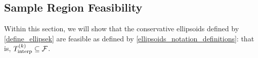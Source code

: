 \subsection{Sample Region Feasibility}
\label{ellipsoid_is_feasible_section}

Within this section, we will show that the conservative ellipsoids defined by \cref{define_ellipsek} are feasible as defined by \cref{ellipsoids_notation_definitions}:
that is, ${T_{\text{interp}}^{(k)}} \subseteq {\mathcal F}$.

